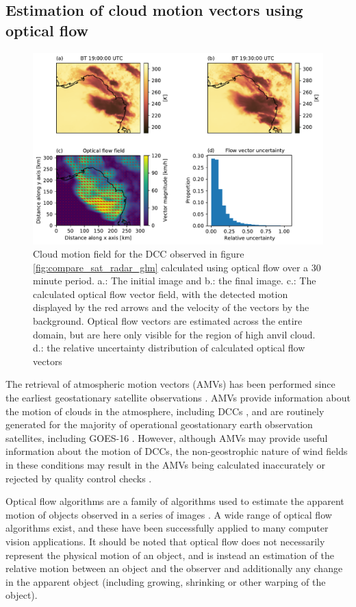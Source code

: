 \documentclass[amt, manuscript]{copernicus}
\begin{document}
\subsection{Estimation of cloud motion vectors using optical flow}

\begin{figure}[t]
    \includegraphics[width=12cm]{figure04.pdf}
    \caption{Cloud motion field for the DCC observed in figure \ref{fig:compare_sat_radar_glm} calculated using optical flow over a 30 minute period. a.: The initial image and b.: the final image. c.: The calculated optical flow vector field, with the detected motion displayed by the red arrows and the velocity of the vectors by the background. Optical flow vectors are estimated across the entire domain, but are here only visible for the region of high anvil cloud. d.: the relative uncertainty distribution of calculated optical flow vectors}
    \label{fig:optical_flow}
\end{figure}


The retrieval of atmospheric motion vectors (AMVs) has been performed since the earliest geostationary satellite observations \citep{menzel_cloud_2001}.
AMVs provide information about the motion of clouds in the atmosphere, including DCCs \citep{bedka_application_2005}, and are routinely generated for the majority of operational geostationary earth observation satellites, including GOES-16 \citep{daniels_algorithm_nodate}. 
However, although AMVs may provide useful information about the motion of DCCs, the non-geostrophic nature of wind fields in these conditions may result in the AMVs being calculated inaccurately or rejected by quality control checks \citep{bedka_application_2005}.

Optical flow algorithms are a family of algorithms used to estimate the apparent motion of objects observed in a series of images \citep{aggarwal_computation_1988}. 
A wide range of optical flow algorithms exist, and these have been successfully applied to many computer vision applications. 
It should be noted that optical flow does not necessarily represent the physical motion of an object, and is instead an estimation of the relative motion between an object and the observer and additionally any change in the apparent object (including growing, shrinking or other warping of the object). 
\end{document}
